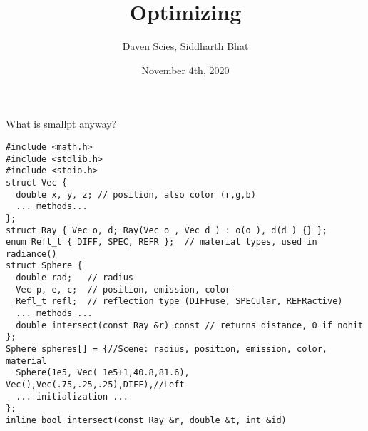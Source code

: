 \documentclass[8pt]{beamer}
\author{Daven Scies, Siddharth Bhat}
\date{November 4th, 2020}
\institute{Haskell Exchange}
\title{Optimizing \smallpt}
\begin{document}
\maketitle

\begin{frame}[fragile]{What is smallpt anyway?}
\begin{verbatim}
#include <math.h>
#include <stdlib.h>
#include <stdio.h>
struct Vec {      
  double x, y, z; // position, also color (r,g,b) 
  ... methods...
}; 
struct Ray { Vec o, d; Ray(Vec o_, Vec d_) : o(o_), d(d_) {} }; 
enum Refl_t { DIFF, SPEC, REFR };  // material types, used in radiance() 
struct Sphere { 
  double rad;   // radius 
  Vec p, e, c;  // position, emission, color 
  Refl_t refl;  // reflection type (DIFFuse, SPECular, REFRactive) 
  ... methods ...
  double intersect(const Ray &r) const // returns distance, 0 if nohit 
}; 
Sphere spheres[] = {//Scene: radius, position, emission, color, material 
  Sphere(1e5, Vec( 1e5+1,40.8,81.6), Vec(),Vec(.75,.25,.25),DIFF),//Left 
  ... initialization ...
}; 
inline bool intersect(const Ray &r, double &t, int &id) 
\end{verbatim}
\end{frame}
\end{document}
